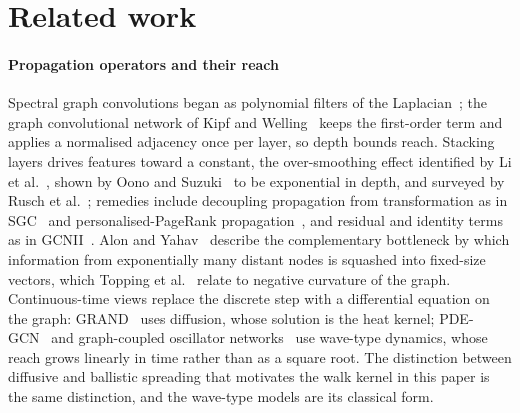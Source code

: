 \documentclass[preprint,11pt,3p]{elsarticle}
\begin{document}
\section{Related work}
\label{sec:related}

\paragraph{Propagation operators and their reach}
Spectral graph convolutions began as polynomial filters of the Laplacian~\cite{chebnet,shuman};
the graph convolutional network of Kipf and Welling~\cite{gcn} keeps the first-order term and
applies a normalised adjacency once per layer, so depth bounds reach. Stacking layers drives
features toward a constant, the over-smoothing effect identified by Li et al.~\cite{lihanwu},
shown by Oono and Suzuki~\cite{oono} to be exponential in depth, and surveyed by Rusch et
al.~\cite{oversmooth}; remedies include decoupling propagation from transformation as in
SGC~\cite{sgc} and personalised-PageRank propagation~\cite{appnp}, and residual and identity
terms as in GCNII~\cite{gcnii}. Alon and Yahav~\cite{oversquash} describe the complementary
bottleneck by which information from exponentially many distant nodes is squashed into
fixed-size vectors, which Topping et al.~\cite{topping} relate to negative curvature of the
graph. Continuous-time views
replace the discrete step with a differential equation on the graph: GRAND~\cite{grand} uses
diffusion, whose solution is the heat kernel; PDE-GCN~\cite{pdegcn} and graph-coupled
oscillator networks~\cite{graphcon} use wave-type dynamics, whose reach grows linearly in
time rather than as a square root. The distinction between diffusive and ballistic spreading
that motivates the walk kernel in this paper is the same distinction, and the wave-type models
are its classical form.
\end{document}

